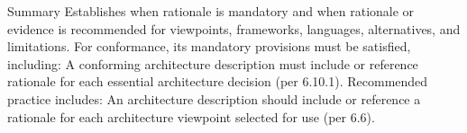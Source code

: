 \documentclass[10pt,letterpaper]{article}
\begin{document}
\begin{CornellSummaryBox}{Summary}
Establishes when rationale is mandatory and when rationale or evidence is recommended for viewpoints, frameworks, languages, alternatives, and limitations. For conformance, its mandatory provisions must be satisfied, including: A conforming architecture description must include or reference rationale for each essential architecture decision (per 6.10.1). Recommended practice includes: An architecture description should include or reference a rationale for each architecture viewpoint selected for use (per 6.6).
\end{CornellSummaryBox}
\end{document}
